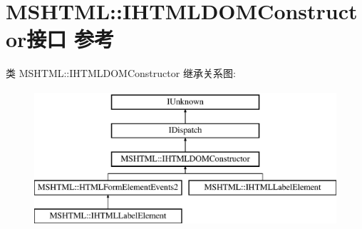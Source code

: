 \hypertarget{interface_m_s_h_t_m_l_1_1_i_h_t_m_l_d_o_m_constructor}{}\section{M\+S\+H\+T\+ML\+:\+:I\+H\+T\+M\+L\+D\+O\+M\+Constructor接口 参考}
\label{interface_m_s_h_t_m_l_1_1_i_h_t_m_l_d_o_m_constructor}
类 M\+S\+H\+T\+ML\+:\+:I\+H\+T\+M\+L\+D\+O\+M\+Constructor 继承关系图\+:\begin{figure}[H]
\begin{center}
\leavevmode
\includegraphics[height=5.000000cm]{interface_m_s_h_t_m_l_1_1_i_h_t_m_l_d_o_m_constructor}
\end{center}
\end{figure}
